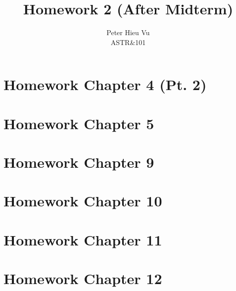 \documentclass[12pt]{article}
\title{\vspace{-1.5cm}Homework 2 (After Midterm)}
\author{Peter Hieu Vu\\ASTR\&101}
\newcommand\onlyinsubfile[1]{#1}
\newcommand\notinsubfile[1]{}
\begin{document}
\renewcommand{\onlyinsubfile}[1]{}
\renewcommand{\notinsubfile}[1]{#1}

\maketitle

\section{Homework Chapter 4 (Pt. 2)}

\newpage

\section{Homework Chapter 5}

\newpage

\section{Homework Chapter 9}

\newpage

\section{Homework Chapter 10}

\newpage

\section{Homework Chapter 11}

\newpage

\section{Homework Chapter 12}

\newpage
\end{document}
